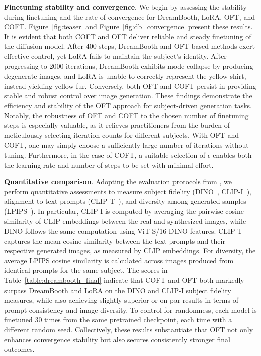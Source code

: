 {\textbf{Finetuning stability and convergence}. We begin by assessing the stability during finetuning and the rate of convergence for DreamBooth, LoRA, OFT, and COFT. Figure~\ref{fig:teaser} and Figure~\ref{fig:db_convergence} present these results. It is evident that both COFT and OFT deliver reliable and steady finetuning of the diffusion model. After 400 steps, DreamBooth and OFT-based methods exert effective control, yet LoRA fails to maintain the subject’s identity. After progressing to 2000 iterations, DreamBooth exhibits mode collapse by producing degenerate images, and LoRA is unable to correctly represent the yellow shirt, instead yielding yellow fur. Conversely, both OFT and COFT persist in providing stable and robust control over image generation. These findings demonstrate the efficiency and stability of the OFT approach for subject-driven generation tasks. Notably, the robustness of OFT and COFT to the chosen number of finetuning steps is especially valuable, as it relieves practitioners from the burden of meticulously selecting iteration counts for different subjects. With OFT and COFT, one may simply choose a sufficiently large number of iterations without tuning. Furthermore, in the case of COFT, a suitable selection of $\epsilon$ enables both the learning rate and number of steps to be set with minimal effort.

\textbf{Quantitative comparison}. Adopting the evaluation protocols from \cite{ruiz2023dreambooth}, we perform quantitative assessments to measure subject fidelity (DINO~\cite{caron2021emerging}, CLIP-I~\cite{radford2021learning}), alignment to text prompts (CLIP-T~\cite{radford2021learning}), and diversity among generated samples (LPIPS~\cite{zhang2018unreasonable}). In particular, CLIP-I is computed by averaging the pairwise cosine similarity of CLIP embeddings between the real and synthesized images, while DINO follows the same computation using ViT S/16 DINO features. CLIP-T captures the mean cosine similarity between the text prompts and their respective generated images, as measured by CLIP embeddings. For diversity, the average LPIPS cosine similarity is calculated across images produced from identical prompts for the same subject. The scores in Table~\ref{table:dreambooth_final} indicate that COFT and OFT both markedly surpass DreamBooth and LoRA on the DINO and CLIP-I subject fidelity measures, while also achieving slightly superior or on-par results in terms of prompt consistency and image diversity. To control for randomness, each model is finetuned 30 times from the same pretrained checkpoint, each time with a different random seed. Collectively, these results substantiate that OFT not only enhances convergence stability but also secures consistently stronger final outcomes.

}
